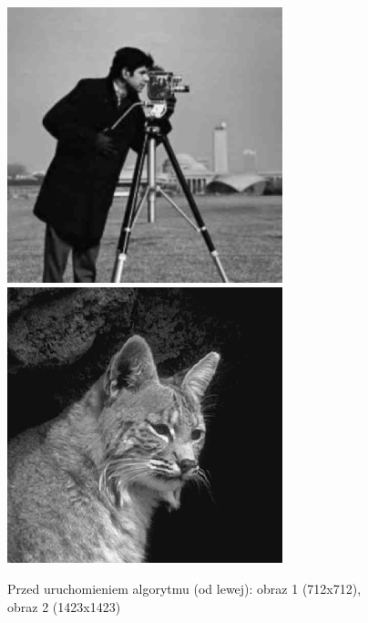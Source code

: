 \documentclass[a4paper,12pt]{book}
\begin{document}
\begin{figure}[H]
	\caption{Przed uruchomieniem algorytmu (od lewej): obraz 1 (712x712), obraz 2 (1423x1423)}
	\includegraphics[width=8cm, height=8cm]{man-unmodified.jpg}
	\includegraphics[width=8cm, height=8cm]{cat-unmodified.jpg}
\end{figure}
\end{document}
